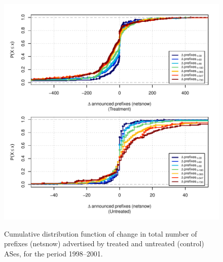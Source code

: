 \begin{figure}[H]
\begin{centering}
\begin{singlespace}
    \includegraphics[width=6in]{figures/behavior-netsnow-1998_2001-corr.pdf}
    \vspace{-2em}\\
    \caption{Cumulative distribution function of change in total number of
    prefixes (netsnow) advertised by treated and untreated (control) ASes, for
    the period 1998--2001.}
\end{singlespace}
\end{centering}
\end{figure}
